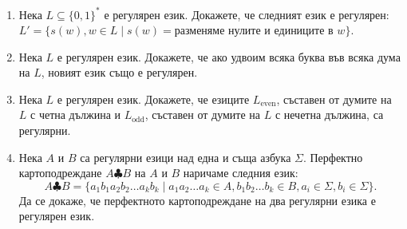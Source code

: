 \documentclass[a4paper]{scrartcl}
\begin{document}
\begin{enumerate}
\begin{proof}[Доказателство.]
            Нека $L$ е регулярен език, имащ регулярен запис с точно $k$ прилагания на регулярните операции. Възможни се следните случаи за $L$:
            \begin{itemize}
                \item $L = K_1 \cup K_2$, където $K_1$ и $K_2$ са регулярни и от индуктивното предположение $K_1^R$ и
                    $K_2^R$ също са регулярни. Тогава $L^R = (K_1 \cup K_2)^R = K_1^R \cup K_2^R$ е регулярен, защото е
                    обединение на регулярни езици.
                \item $L = K_1 K_2$, където $K_1$ и $K_2$ са регулярни и от индуктивното предположение $K_1^R$ и $K_2^R$
                    също са регулярни. Тогава $L^R = (K_1 K_2)^R = K_2^R K_1^R$ е регулярен, защото е конкатенация на
                    регулярни езици.
                \item $L = K^*$, където $K$ е регулярен и от индуктивното предположение $K^R$ също е регулярен. Тогава $L^R
                    = (K^*)^R = (K^R)^*$ е регулярен, защото е итерация на регулярен език.
            \end{itemize}
            Във всички възможни случаи за $L$ доказахме, че $L^R$ е регулярен.
            От това по индукция следва, че ако $L$ е регулярен, то и $L^R$ е регулярен.
        \end{proof}

    \item Нека $L \subseteq \{0, 1\}^*$ е регулярен език. Докажете, че следният език е регулярен:
        $L' = \{s(w), w \in L \mid s(w) = \text{разменяме нулите и единиците в } w\}$.

    \item Нека $L$ е регулярен език. Докажете, че ако удвоим всяка буква във всяка дума на $L$, новият език също е регулярен.

    \item Нека $L$ е регулярен език. Докажете, че езиците $L_{\text{even}}$, съставен от думите на $L$ с четна дължина и $L_{\text{odd}}$, съставен от думите на $L$ с нечетна дължина, са регулярни.

    \item Нека $A$ и $B$ са регулярни езици над една и съща азбука $\Sigma$. Перфектно картоподреждане $A \clubsuit B$ на $A$ и $B$ наричаме следния език:
        \[A \clubsuit B = \{ a_1 b_1 a_2 b_2 \dots a_k b_k \mid a_1 a_2 \dots a_k \in A, b_1 b_2 \dots b_k \in B, a_i \in \Sigma, b_i \in \Sigma\}.\]
        Да се докаже, че перфектното картоподреждане на два регулярни езика е регулярен език.


\end{enumerate}
\end{document}
